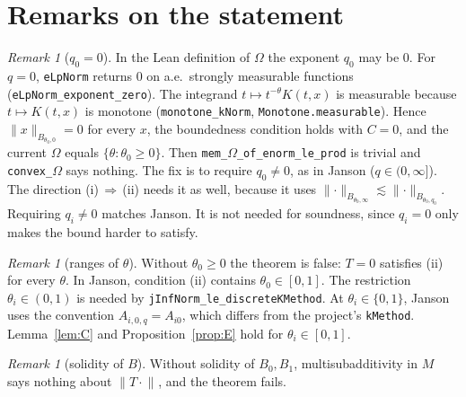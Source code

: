 \documentclass[11pt]{article}
\theoremstyle{definition}
\theoremstyle{remark}
\newtheorem{remark}[theorem]{Remark}
\newcommand{\norm}[2]{\lVert #1\rVert_{#2}}
\begin{document}
\section{Remarks on the statement}

\begin{remark}[\(q_0 = 0\)]\label{rem:q0}
  In the Lean definition of \(\Omega\) the exponent \(q_0\) may be \(0\). For \(q = 0\),
  \texttt{eLpNorm} returns \(0\) on a.e.\ strongly measurable functions
  (\texttt{eLpNorm\_exponent\_zero}). The integrand \(t\mapsto t^{-\theta}K(t,x)\) is
  measurable because \(t\mapsto K(t,x)\) is monotone (\texttt{monotone\_kNorm},
  \texttt{Monotone.measurable}). Hence \(\norm{x}{B_{\theta_0,0}} = 0\) for every \(x\), the
  boundedness condition holds with \(C = 0\), and the current \texttt{\(\Omega\)} equals
  \(\{\theta : \theta_0 \ge 0\}\). Then \texttt{mem\_\(\Omega\)\_of\_enorm\_le\_prod} is trivial
  and \texttt{convex\_\(\Omega\)} says nothing. The fix is to require \(q_0 \ne 0\), as in
  Janson (\(q\in(0,\infty]\)). The direction (i)\,\(\Rightarrow\)\,(ii) needs it as well,
  because it uses \(\norm{\cdot}{B_{\theta_0,\infty}} \lesssim \norm{\cdot}{B_{\theta_0,q_0}}\).
  Requiring \(q_i\ne0\) matches Janson. It is not needed for soundness, since \(q_i = 0\) only
  makes the bound harder to satisfy.
\end{remark}

\begin{remark}[ranges of \(\theta\)]
  Without \(\theta_0 \ge 0\) the theorem is false: \(T = 0\) satisfies (ii) for every
  \(\theta\). In Janson, condition (ii) contains \(\theta_0\in[0,1]\). The restriction
  \(\theta_i\in(0,1)\) is needed by \texttt{jInfNorm\_le\_discreteKMethod}. At
  \(\theta_i\in\{0,1\}\), Janson uses the convention \(A_{i,0,q} = A_{i0}\), which differs
  from the project's \texttt{kMethod}. Lemma~\ref{lem:C} and Proposition~\ref{prop:E} hold for
  \(\theta_i\in[0,1]\).
\end{remark}

\begin{remark}[solidity of \(B\)]
  Without solidity of \(B_0, B_1\), multisubadditivity in \(M\) says nothing about
  \(\norm{T\cdot}{}\), and the theorem fails.
\end{remark}
\end{document}
